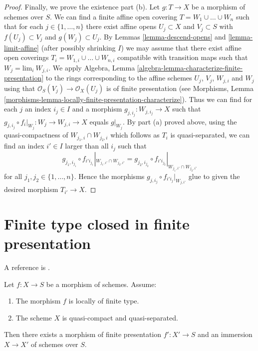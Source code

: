 \begin{proof}
\medskip\noindent
Finally, we prove the existence part (b).
Let $g : T \to X$ be a morphism of schemes over $S$.
We can find a finite affine open covering
$T = W_1 \cup \ldots \cup W_n$ such that for
each $j \in \{1, \ldots, n\}$ there exist affine opens
$U_j \subset X$ and $V_j \subset S$ with $f(U_j) \subset V_j$
and $g(W_j) \subset U_j$. By Lemmas \ref{lemma-descend-opens}
and \ref{lemma-limit-affine}
(after possibly shrinking $I$) we may assume that
there exist affine open coverings $T_i = W_{1, i} \cup \ldots \cup W_{n, i}$
compatible with transition maps such that $W_j = \text{lim}_i\ W_{j, i}$.
We apply Algebra, Lemma \ref{algebra-lemma-characterize-finite-presentation}
to the rings corresponding to the affine schemes $U_j$, $V_j$, $W_{j, i}$ and
$W_j$ using that $\mathcal{O}_S(V_j) \to \mathcal{O}_X(U_j)$ is of finite
presentation (see Morphisms,
Lemma \ref{morphisms-lemma-locally-finite-presentation-characterize}).
Thus we can find for each $j$ an index $i_j \in I$ and a morphism
$g_{j, i_j} : W_{j, i_j} \to X$ such that
$g_{j, i_j} \circ f_i|_{W_j} : W_j \to W_{j, i} \to X$
equals $g|_{W_j}$. By part (a) proved above, using the quasi-compactness of
$W_{j_1, i} \cap W_{j_2, i}$ which follows as $T_i$ is quasi-separated,
we can find an index $i' \in I$ larger than all $i_j$ such that
$$
g_{j_1, i_{j_1}} \circ f_{i'i_{j_1}}|_{W_{j_1, i'} \cap W_{j_2, i'}} =
g_{j_2, i_{j_2}} \circ f_{i'i_{j_2}}|_{W_{j_1, i'} \cap W_{j_2, i'}}
$$
for all $j_1, j_2 \in \{1, \ldots, n\}$. Hence the morphisms
$g_{j, i_j} \circ f_{i'i_j}|_{W_{j, i'}}$ glue to given the
desired morphism $T_{i'} \to X$.
\end{proof}







\section{Finite type closed in finite presentation}
\label{section-finite-type-closed-in-finite-presentation}

\noindent
A reference is \cite{Conrad-Nagata}.

\begin{lemma}
\label{lemma-locally-finite-type-in-finite-presentation}
Let $f : X \to S$ be a morphism of schemes.
Assume:
\begin{enumerate}
\item The morphism $f$ is locally of finite type.
\item The scheme $X$ is quasi-compact and quasi-separated.
\end{enumerate}
Then there exists a morphism of finite presentation
$f' : X' \to S$ and an immersion $X \to X'$ of schemes over $S$.
\end{lemma}

